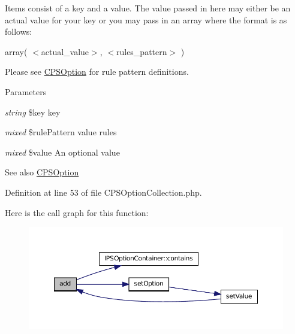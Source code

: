 Items consist of a key and a value. The value passed in here may either be an actual value for your key or you may pass in an array where the format is as follows:

array( $<$actual\_\-value$>$, $<$rules\_\-pattern$>$ )

Please see \hyperlink{classCPSOption}{CPSOption} for rule pattern definitions.


\begin{DoxyParams}{Parameters}
\item[{\em string}]\$key key \item[{\em mixed}]\$rulePattern value rules \item[{\em mixed}]\$value An optional value \end{DoxyParams}
\begin{DoxySeeAlso}{See also}
\hyperlink{classCPSOption}{CPSOption} 
\end{DoxySeeAlso}


Definition at line 53 of file CPSOptionCollection.php.








Here is the call graph for this function:\nopagebreak
\begin{figure}[H]
\begin{center}
\leavevmode
\includegraphics[width=400pt]{classCPSOptionCollection_a08c68129fce5aa8f1f5249a7f414e1c5_cgraph}
\end{center}
\end{figure}




